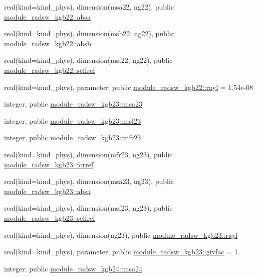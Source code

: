 \begin{DoxyCompactItemize}
\item 
real(kind=kind\+\_\+phys), dimension(msa22, ng22), public \hyperlink{namespacemodule__radsw__kgb22_a15ed79e7136ed6d7f11c19a81281af53}{module\+\_\+radsw\+\_\+kgb22\+::absa}
\item 
real(kind=kind\+\_\+phys), dimension(msb22, ng22), public \hyperlink{namespacemodule__radsw__kgb22_a60403e7d343c85e965f3507b0db0f2a5}{module\+\_\+radsw\+\_\+kgb22\+::absb}
\item 
real(kind=kind\+\_\+phys), dimension(msf22, ng22), public \hyperlink{namespacemodule__radsw__kgb22_abc3bd99e8ad7d1f09fb7fab7ed67a32b}{module\+\_\+radsw\+\_\+kgb22\+::selfref}
\item 
real(kind=kind\+\_\+phys), parameter, public \hyperlink{namespacemodule__radsw__kgb22_ae77b766677ea476e2ba14b88e511870a}{module\+\_\+radsw\+\_\+kgb22\+::rayl} = 1.\+54e-\/08
\item 
integer, public \hyperlink{namespacemodule__radsw__kgb23_a744e7ef73b8d3cc01ff9c6a6010d95d7}{module\+\_\+radsw\+\_\+kgb23\+::msa23}
\item 
integer, public \hyperlink{namespacemodule__radsw__kgb23_ab96959c26232963a568609451483843e}{module\+\_\+radsw\+\_\+kgb23\+::msf23}
\item 
integer, public \hyperlink{namespacemodule__radsw__kgb23_a78b43ec4bc2afd4f520480a8410d9df5}{module\+\_\+radsw\+\_\+kgb23\+::mfr23}
\item 
real(kind=kind\+\_\+phys), dimension(mfr23, ng23), public \hyperlink{namespacemodule__radsw__kgb23_a18fabad311919ee30b2d367fbe250bcc}{module\+\_\+radsw\+\_\+kgb23\+::forref}
\item 
real(kind=kind\+\_\+phys), dimension(msa23, ng23), public \hyperlink{namespacemodule__radsw__kgb23_a2541e41c7d445a2ce73283e2fb76270c}{module\+\_\+radsw\+\_\+kgb23\+::absa}
\item 
real(kind=kind\+\_\+phys), dimension(msf23, ng23), public \hyperlink{namespacemodule__radsw__kgb23_ae4e51bcb3c3cbaaf1476d5ab18b072e5}{module\+\_\+radsw\+\_\+kgb23\+::selfref}
\item 
real(kind=kind\+\_\+phys), dimension(ng23), public \hyperlink{namespacemodule__radsw__kgb23_a40006f284543c7347eced417b9de2fc6}{module\+\_\+radsw\+\_\+kgb23\+::rayl}
\item 
real(kind=kind\+\_\+phys), parameter, public \hyperlink{namespacemodule__radsw__kgb23_a5f6ced06169db4b7470e20d5639ac54c}{module\+\_\+radsw\+\_\+kgb23\+::givfac} = 1.
\item 
integer, public \hyperlink{namespacemodule__radsw__kgb24_ad416df05aed8a6ae1ecd57d5c90c223c}{module\+\_\+radsw\+\_\+kgb24\+::msa24}

\end{DoxyCompactItemize}
